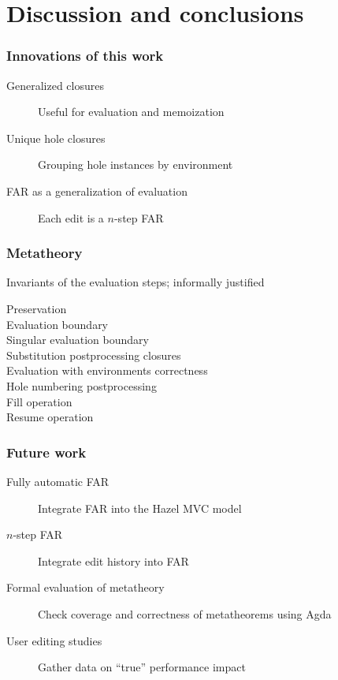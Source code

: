 \documentclass{beamer}
\begin{document}
\section{Discussion and conclusions}

\begin{frame}
  \frametitle{Innovations of this work}

  \begin{description}
  \item[Generalized closures] Useful for evaluation and memoization
  \item[Unique hole closures] Grouping hole instances by environment
  \item[FAR as a generalization of evaluation] Each edit is a $n$-step FAR
  \end{description}
\end{frame}

\begin{frame}
  \frametitle{Metatheory}

  Invariants of the evaluation steps; informally justified

  \begin{description}
  \item[Preservation]
  \item[Evaluation boundary]
  \item[Singular evaluation boundary]
  \item[Substitution postprocessing closures]
  \item[Evaluation with environments correctness]
  \item[Hole numbering postprocessing]
  \item[Fill operation]
  \item[Resume operation]
  \end{description}
\end{frame}

\begin{frame}
  \frametitle{Future work}

  \begin{description}
  \item[Fully automatic FAR] Integrate FAR into the Hazel MVC model
  \item[$n$-step FAR] Integrate edit history into FAR
  \item[Formal evaluation of metatheory] Check coverage and correctness of metatheorems using Agda
  \item[User editing studies] Gather data on ``true'' performance impact
  \end{description}
\end{frame}
\end{document}
